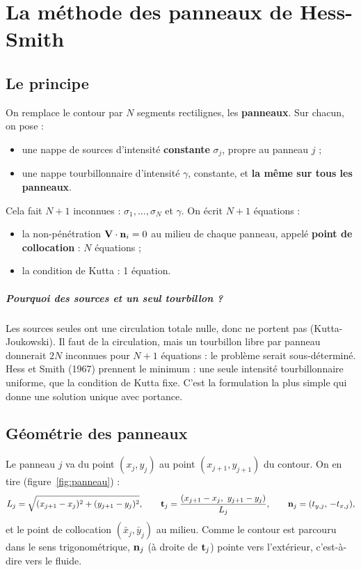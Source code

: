 \chapter{La méthode des panneaux de Hess-Smith}\label{ch:panneaux}

\section{Le principe}
On remplace le contour par $N$ segments rectilignes, les \textbf{panneaux}. Sur chacun, on pose :
\begin{itemize}
\item une nappe de sources d'intensité \textbf{constante} $\sigma_j$, propre au panneau $j$ ;
\item une nappe tourbillonnaire d'intensité $\gamma$, constante, et \textbf{la même sur tous les panneaux}.
\end{itemize}
Cela fait $N+1$ inconnues : $\sigma_1,\dots,\sigma_N$ et $\gamma$. On écrit $N+1$ équations :
\begin{itemize}
\item la non-pénétration $\mathbf{V}\cdot\mathbf{n}_i=0$ au milieu de chaque panneau, appelé \textbf{point de collocation} : $N$ équations ;
\item la condition de Kutta : 1 équation.
\end{itemize}

\paragraph{Pourquoi des sources et un seul tourbillon ?} Les sources seules ont une circulation totale nulle, donc ne portent pas (Kutta-Joukowski). Il faut de la circulation, mais un tourbillon libre par panneau donnerait $2N$ inconnues pour $N+1$ équations : le problème serait sous-déterminé. Hess et Smith (1967) prennent le minimum : une seule intensité tourbillonnaire uniforme, que la condition de Kutta fixe. C'est la formulation la plus simple qui donne une solution unique avec portance.

\section{Géométrie des panneaux}
Le panneau $j$ va du point $(x_j,y_j)$ au point $(x_{j+1},y_{j+1})$ du contour. On en tire (figure~\ref{fig:panneau}) :
\[
L_j=\sqrt{(x_{j+1}-x_j)^2+(y_{j+1}-y_j)^2},\qquad
\mathbf{t}_j=\frac{(x_{j+1}-x_j,\ y_{j+1}-y_j)}{L_j},\qquad
\mathbf{n}_j=(t_{y,j},\,-t_{x,j}),
\]
et le point de collocation $(\bar x_j,\bar y_j)$ au milieu. Comme le contour est parcouru dans le sens trigonométrique, $\mathbf{n}_j$ (à droite de $\mathbf{t}_j$) pointe vers l'extérieur, c'est-à-dire vers le fluide.

